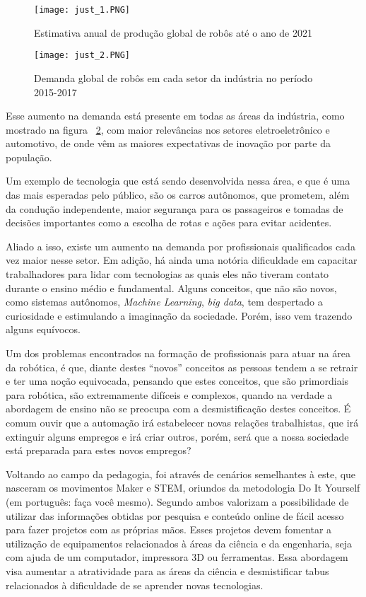 \begin{figure}[h!]										\caption{Estimativa anual de produção global de robôs até o ano de 2021} \label{fig:just_1}		
	\centering										
	\texttt{[image: just\_1.PNG]}
\end{figure}

\begin{figure}[h!]										\caption{Demanda global de robôs em cada setor da indústria no período 2015-2017} \label{fig:just_2}		
	\centering										
	\texttt{[image: just\_2.PNG]}
\end{figure}

Esse aumento na demanda está presente em todas as áreas da indústria, como mostrado na figura ~\ref{fig:just_2}, com maior relevâncias nos setores eletroeletrônico e automotivo, de onde vêm as maiores expectativas de inovação por parte da população.
 
Um exemplo de tecnologia que está sendo desenvolvida nessa área, e que é uma das mais esperadas pelo público, são os carros autônomos, que prometem, além da condução independente, maior segurança para os passageiros e tomadas de decisões importantes como a escolha de rotas e ações para evitar acidentes.

Aliado a isso, existe um aumento na demanda por profissionais qualificados cada vez maior nesse setor. Em adição, há ainda uma notória dificuldade em capacitar trabalhadores para lidar com tecnologias as quais eles não tiveram contato durante o ensino médio e fundamental. Alguns conceitos, que não são novos, como sistemas autônomos, \textit{Machine Learning}, \textit{big data}, tem despertado a curiosidade e estimulando a imaginação da sociedade. Porém, isso vem trazendo alguns equívocos.

Um dos problemas encontrados na formação de profissionais para atuar na área da robótica, é que, diante destes “novos” conceitos as pessoas tendem a se retrair e ter uma noção equivocada, pensando que estes conceitos, que são primordiais para robótica, são extremamente difíceis e complexos, quando na verdade a abordagem de ensino não se preocupa com a desmistificação destes conceitos. É comum ouvir que a automação irá estabelecer novas relações trabalhistas, que irá extinguir alguns empregos e irá criar outros, porém, será que a nossa sociedade está preparada para estes novos empregos? 

Voltando ao campo da pedagogia, foi através de cenários semelhantes à este, que nasceram os movimentos Maker e STEM, oriundos da metodologia Do It Yourself (em português: faça você mesmo). Segundo \cite{Pugliese} ambos valorizam a possibilidade de utilizar das informações obtidas por pesquisa e conteúdo online de fácil acesso para fazer projetos com as próprias mãos. Esses projetos devem fomentar a utilização de equipamentos relacionados à áreas da ciência e da engenharia, seja com ajuda de um computador, impressora 3D ou ferramentas. Essa abordagem visa aumentar a atratividade para as áreas da ciência e desmistificar tabus relacionados à dificuldade de se aprender novas tecnologias.
 
